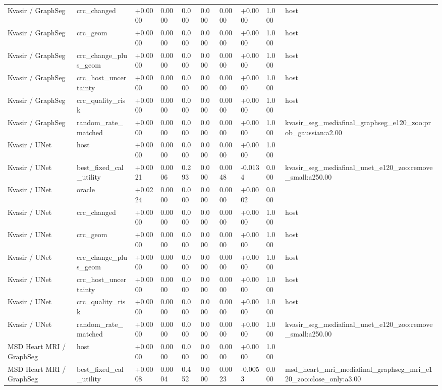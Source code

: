 \begin{table}[t]
\begin{tabular}{llllllllll}
Kvasir / GraphSeg & crc\_changed & +0.0000 & 0.0000 & 0.000 & 0.000 & 0.0000 & +0.0000 & 1.000 & host \\
Kvasir / GraphSeg & crc\_geom & +0.0000 & 0.0000 & 0.000 & 0.000 & 0.0000 & +0.0000 & 1.000 & host \\
Kvasir / GraphSeg & crc\_change\_plus\_geom & +0.0000 & 0.0000 & 0.000 & 0.000 & 0.0000 & +0.0000 & 1.000 & host \\
Kvasir / GraphSeg & crc\_host\_uncertainty & +0.0000 & 0.0000 & 0.000 & 0.000 & 0.0000 & +0.0000 & 1.000 & host \\
Kvasir / GraphSeg & crc\_quality\_risk & +0.0000 & 0.0000 & 0.000 & 0.000 & 0.0000 & +0.0000 & 1.000 & host \\
Kvasir / GraphSeg & random\_rate\_matched & +0.0000 & 0.0000 & 0.000 & 0.000 & 0.0000 & +0.0000 & 1.000 & kvasir\_seg\_mediafinal\_graphseg\_e120\_zoo:prob\_gaussian:a2.00 \\
Kvasir / UNet & host & +0.0000 & 0.0000 & 0.000 & 0.000 & 0.0000 & +0.0000 & 1.000 &  \\
Kvasir / UNet & best\_fixed\_cal\_utility & +0.0021 & 0.0006 & 0.293 & 0.000 & 0.0048 & -0.0134 & 0.000 & kvasir\_seg\_mediafinal\_unet\_e120\_zoo:remove\_small:a250.00 \\
Kvasir / UNet & oracle & +0.0224 & 0.0000 & 0.000 & 0.000 & 0.0000 & +0.0002 & 0.000 &  \\
Kvasir / UNet & crc\_changed & +0.0000 & 0.0000 & 0.000 & 0.000 & 0.0000 & +0.0000 & 1.000 & host \\
Kvasir / UNet & crc\_geom & +0.0000 & 0.0000 & 0.000 & 0.000 & 0.0000 & +0.0000 & 1.000 & host \\
Kvasir / UNet & crc\_change\_plus\_geom & +0.0000 & 0.0000 & 0.000 & 0.000 & 0.0000 & +0.0000 & 1.000 & host \\
Kvasir / UNet & crc\_host\_uncertainty & +0.0000 & 0.0000 & 0.000 & 0.000 & 0.0000 & +0.0000 & 1.000 & host \\
Kvasir / UNet & crc\_quality\_risk & +0.0000 & 0.0000 & 0.000 & 0.000 & 0.0000 & +0.0000 & 1.000 & host \\
Kvasir / UNet & random\_rate\_matched & +0.0000 & 0.0000 & 0.000 & 0.000 & 0.0000 & +0.0000 & 1.000 & kvasir\_seg\_mediafinal\_unet\_e120\_zoo:remove\_small:a250.00 \\
MSD Heart MRI / GraphSeg & host & +0.0000 & 0.0000 & 0.000 & 0.000 & 0.0000 & +0.0000 & 1.000 &  \\
MSD Heart MRI / GraphSeg & best\_fixed\_cal\_utility & +0.0008 & 0.0004 & 0.452 & 0.000 & 0.0023 & -0.0053 & 0.000 & msd\_heart\_mri\_mediafinal\_graphseg\_mri\_e120\_zoo:close\_only:a3.00 \\

\end{tabular}
\end{table}
